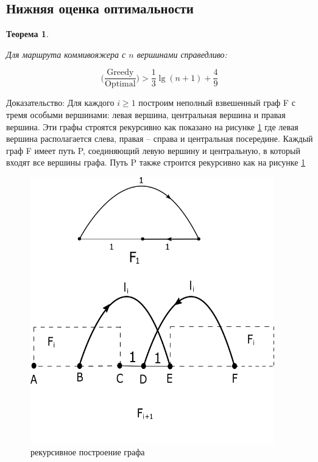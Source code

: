 \documentclass[a4paper, 14pt]{extarticle}
\numberwithin{equation}{section}
\newtheorem{theorem}{Теорема}[section]
\begin{document}
\subsection{Нижняя оценка оптимальности}

\begin{theorem}
\label{theoremtwometric}

Для маршрута коммивояжера с $n$ вершинами справедливо:

\begin{equation*}
	\Big(\frac{\mathrm{Greedy}}{\mathrm{Optimal}}\Big) > \frac{1}{3}{\lg (n+1)} + \frac{4}{9}
\end{equation*}

\end{theorem}

Доказательство:  Для каждого $i \geqslant 1 $ построим неполный взвешенный граф F с тремя особыми вершинами: левая вершина, центральная вершина и правая вершина. Эти графы строятся рекурсивно как показано на рисунке \ref{fig:recursiveGraph} где левая вершина располагается слева, правая -- справа и центральная посередине. Каждый граф F имеет путь P, соединяющий левую вершину и центральную, в который входят все вершины графа. Путь P также строится рекурсивно как на рисунке \ref{fig:recursiveGraph} 

\begin{figure}[h!]
\begin{center}
\includegraphics[width=300pt]{ris1.png}
\caption{рекурсивное построение графа}
\label{fig:recursiveGraph}
\end{center}
\end{figure}
\end{document}
